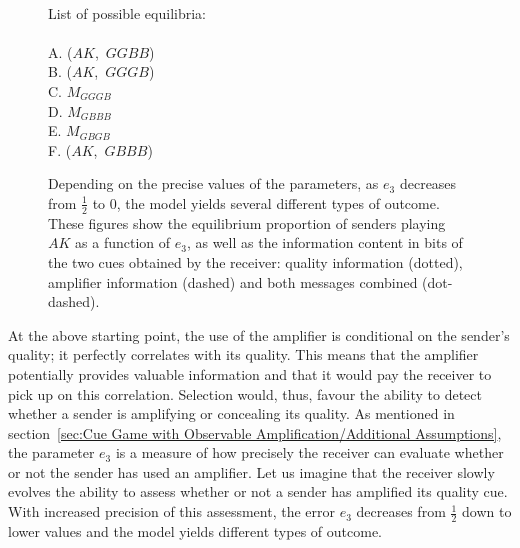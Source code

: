 \documentclass[a4paper,12pt]{article}
\numberwithin{equation}{section}
\begin{document}
\begin{figure}[h]
\captionsetup{width=440pt}
\hfill
{}\\[-2mm]
\hfill
\begin{minipage}[t]{.45\textwidth}
\vspace{-45mm}
List of possible equilibria:\\
\\
A. ($AK$,~$GGBB$)\\
B. ($AK$,~$GGGB$)\\
C. $M_{GGGB}$\\
D. $M_{GBBB}$\\
E. $M_{GBGB}$\\
F. ($AK$,~$GBBB$)
\end{minipage}
\vspace{-1mm}
\caption{Depending on the precise values of the parameters, as $e_{3}$ decreases from $\frac{1}{2}$ to $0$, the model yields several different types of outcome. These figures show the equilibrium proportion of senders playing $AK$ as a function of $e_{3}$, as well as the information content in bits of the two cues obtained by the receiver: quality information (dotted), amplifier information (dashed) and both messages combined (dot-dashed).}
\label{fig:Model 1/Figure 8910}
\end{figure}

At the above starting point, the use of the amplifier is conditional on the sender's quality; it perfectly correlates with its quality. This means that the amplifier potentially provides valuable information and that it would pay the receiver to pick up on this correlation. Selection would, thus, favour the ability to detect whether a sender is amplifying or concealing its quality. As mentioned in section~\ref{sec:Cue Game with Observable Amplification/Additional Assumptions}, the parameter $e_{3}$ is a measure of how precisely the receiver can evaluate whether or not the sender has used an amplifier. Let us imagine that the receiver slowly evolves the ability to assess whether or not a sender has amplified its quality cue. With increased precision of this assessment, the error $e_{3}$ decreases from $\frac{1}{2}$ down to lower values and the model yields different types of outcome.
\end{document}
